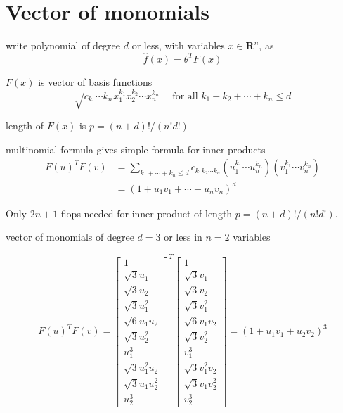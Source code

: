 \section{Vector of monomials}

\begin{definition}
    write polynomial of degree $ d $ or less, with variables $ x \in \mathbf{R}^{n} $, as
$$
\hat{f}(x)=\theta^{T} F(x)
$$

$ F(x) $ is vector of basis functions
$$
\sqrt{c_{k_{1}} \cdots k_{n}} x_{1}^{k_{1}} x_{2}^{k_{2}} \cdots x_{n}^{k_{n}} \quad \text { for all } k_{1}+k_{2}+\cdots+k_{n} \leq d
$$
\end{definition}

\begin{theorem}
    length of $ F(x) $ is $ p=(n+d) ! /(n ! d !) $
\end{theorem}

\begin{theorem}
    multinomial formula gives simple formula for inner products
    $$
    \begin{aligned}
    F(u)^{T} F(v) &=\sum_{k_{1}+\cdots+k_{n} \leq d} c_{k_{1} k_{2} \cdots k_{n}}\left(u_{1}^{k_{1}} \cdots u_{n}^{k_{n}}\right)\left(v_{1}^{k_{1}} \cdots v_{n}^{k_{n}}\right) \\
    &=\left(1+u_{1} v_{1}+\cdots+u_{n} v_{n}\right)^{d}
    \end{aligned}
    $$
\end{theorem}


Only $ 2 n+1 $ flops needed for inner product of length $ p=(n+d) ! /(n ! d !) $.

\begin{example}
    vector of monomials of degree $ d=3 $ or less in $ n=2 $ variables

$$ F(u)^{T} F(v)=\left[\begin{array}{c}1 \\ \sqrt{3} u_{1} \\ \sqrt{3} u_{2} \\ \sqrt{3} u_{1}^{2} \\ \sqrt{6} u_{1} u_{2} \\ \sqrt{3} u_{2}^{2} \\ u_{1}^{3} \\ \sqrt{3} u_{1}^{2} u_{2} \\ \sqrt{3} u_{1} u_{2}^{2} \\ u_{2}^{3}\end{array}\right]^{T}\left[\begin{array}{c}1 \\ \sqrt{3} v_{1} \\ \sqrt{3} v_{2} \\ \sqrt{3} v_{1}^{2} \\ \sqrt{6} v_{1} v_{2} \\ \sqrt{3} v_{2}^{2} \\ v_{1}^{3} \\ \sqrt{3} v_{1}^{2} v_{2} \\ \sqrt{3} v_{1} v_{2}^{2} \\ v_{2}^{3}\end{array}\right] 
 =\left(1+u_{1} v_{1}+u_{2} v_{2}\right)^{3} $$
\end{example}



